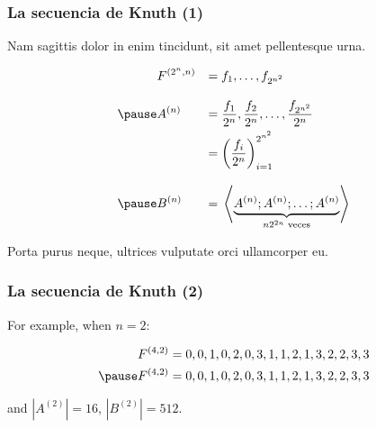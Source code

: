 \documentclass[t, 10pt, mathserif]{beamer}
\begin{document}
\begin{frame}
  \frametitle{La secuencia de Knuth (1)}

  Nam sagittis dolor in enim tincidunt, sit amet pellentesque urna.

  \begin{equation*}
    \begin{aligned}
      & F^{(2^n, n)}  & = \; & f_1, \dots, f_{2^{n^2}} \\[0.3cm]
      \pause
      & A^{(n)}       & = \; & \frac{f_1}{2^n}, \frac{f_2}{2^n}, \dots, \frac{f_{2^{n^2}}}{2^n} \\
      &               & = \; & \bigg( \frac{f_i}{2^n} \bigg)_{i = 1}^{2^{n^2}} \\[0.3cm]
      \pause
      & B^{(n)}       & = \; & \left< \underbrace{A^{(n)} ; A^{(n)} ; \dots ; A^{(n)}}_{n 2^{2 n} \text{ veces}} \right>
    \end{aligned}
  \end{equation*}
  \pause

  Porta purus neque, ultrices vulputate orci ullamcorper eu.
\end{frame}




\begin{frame}
  \frametitle{La secuencia de Knuth (2)}

  For example, when $n = 2$:

  \begin{equation*}
    \begin{aligned}
      & F^{(4, 2)} = 0, 0, 1, 0, 2, 0, 3, 1, 1, 2, 1, 3, 2, 2, 3, 3 \\
      \pause
      & F^{(4, 2)} = 0, 0, 1, 0, 2, 0, 3, 1, 1, 2, 1, 3, 2, 2, 3, 3 \\
    \end{aligned}
  \end{equation*}
  


  and $|A^{(2)}| = 16$, $|B^{(2)}| = 512$.
\end{frame}
\end{document}
